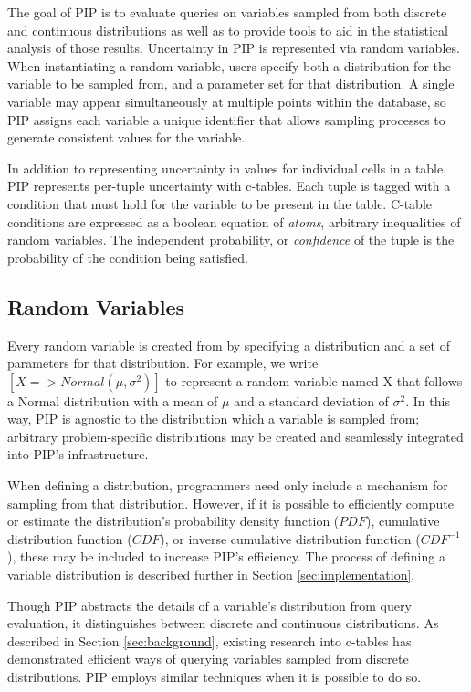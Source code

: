 The goal of PIP is to evaluate queries on variables sampled from both discrete and continuous distributions as well as to provide tools to aid in the statistical analysis of those results.  Uncertainty in PIP is represented via random variables.  When instantiating a random variable, users specify both a distribution for the variable to be sampled from, and a parameter set for that distribution.  A single variable may appear simultaneously at multiple points within the database, so PIP assigns each variable a unique identifier that allows sampling processes to generate consistent values for the variable.

In addition to representing uncertainty in values for individual cells in a table, PIP represents per-tuple uncertainty with c-tables.  Each tuple is tagged with a condition that must hold for the variable to be present in the table.  C-table conditions are expressed as a boolean equation of \textit{atoms}, arbitrary inequalities of random variables.  The independent probability, or \textit{confidence} of the tuple is the probability of the condition being satisfied.  

\subsection{Random Variables}
Every random variable is created from by specifying a distribution and a set of parameters for that distribution.  For example, we write $[X=>Normal(\mu,\sigma^2)]$ to represent a random variable named X that follows a Normal distribution with a mean of $\mu$ and a standard deviation of $\sigma^2$.  In this way, PIP is agnostic to the distribution which a variable is sampled from; arbitrary problem-specific distributions may be created and seamlessly integrated into PIP's infrastructure.  

When defining a distribution, programmers need only include a mechanism for sampling from that distribution.  However, if it is possible to efficiently compute or estimate the distribution's probability density function ($PDF$), cumulative distribution function ($CDF$), or inverse cumulative distribution function ($CDF^{-1}$), these may be included to increase PIP's efficiency.  The process of defining a variable distribution is described further in Section \ref{sec:implementation}.  

Though PIP abstracts the details of a variable's distribution from query evaluation, it distinguishes between discrete and continuous distributions.  As described in Section \ref{sec:background}, existing research into c-tables has demonstrated efficient ways of querying variables sampled from discrete distributions.  PIP employs similar techniques when it is possible to do so.

